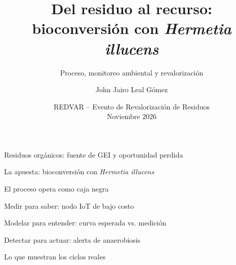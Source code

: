 \documentclass[aspectratio=169, 11pt]{beamer}
\title[Bioconversión BSF]{Del residuo al recurso: bioconversión con \textit{Hermetia illucens}}
\subtitle{Proceso, monitoreo ambiental y revalorización}
\author{John Jairo Leal Gómez}
\institute[UNAL]{Doctorado en Estudios Ambientales\\Universidad Nacional de Colombia -- Sede Palmira}
\date{REDVAR -- Evento de Revalorización de Residuos\\Noviembre 2026}
\newcommand{\BSF}{\textit{Hermetia illucens}}
\begin{document}

\begin{frame}[plain]
    \titlepage
\end{frame}

\begin{frame}{Residuos orgánicos: fuente de GEI y oportunidad perdida}
\end{frame}


\begin{frame}{La apuesta: bioconversión con \BSF{}}
\end{frame}

\begin{frame}{El proceso opera como caja negra}
\end{frame}

\begin{frame}{Medir para saber: nodo IoT de bajo costo}
\end{frame}

\begin{frame}{Modelar para entender: curva esperada vs. medición}
\end{frame}

\begin{frame}{Detectar para actuar: alerta de anaerobiosis}
\end{frame}

\begin{frame}{Lo que muestran los ciclos reales}
\end{frame}
\end{document}
